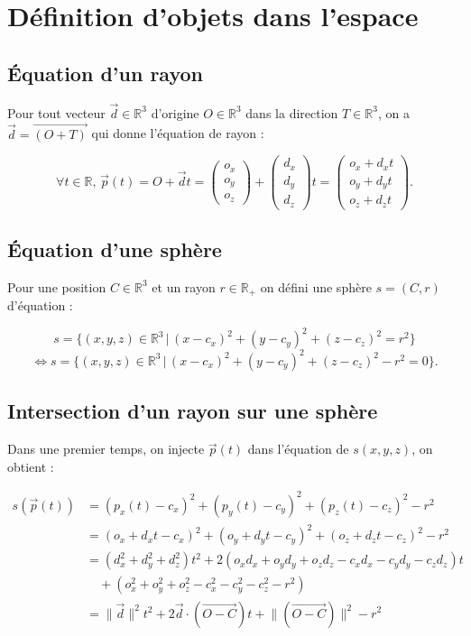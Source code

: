 \section{Définition d'objets dans l'espace}

\subsection{Équation d'un rayon}

Pour tout vecteur $\vec{d} \in \mathbb{R}^3$ d'origine $O \in \mathbb{R}^3$ dans la direction $T \in \mathbb{R}^3$, on a $\vec{d}=\overrightarrow{(O+T)}$ qui donne l'équation de rayon :

$$
\forall t  \in \mathbb{R}, \, 
{\vec{p}(t)} = {O + \vec{d}t} = \begin{pmatrix} o_x\\o_y\\o_z\end{pmatrix} + \begin{pmatrix} d_x\\d_y\\d_z\end{pmatrix}t =
\begin{pmatrix} o_x+d_xt\\o_y+d_yt\\o_z+d_zt\end{pmatrix}.
$$

\subsection{Équation d'une sphère}

Pour une position $C \in \mathbb{R}^3$ et un rayon $r \in \mathbb{R}_+$ on défini une sphère $s=(C, r)$ d'équation :

$$s = \{(x,y,z) \in \mathbb{R}^3 \, | \, (x - c_x)^2 + (y - c_y)^2 + (z - c_z)^2 = r^2 \}$$
$$\Leftrightarrow s = \{(x,y,z) \in \mathbb{R}^3 \, | \, (x - c_x)^2 + (y - c_y)^2 + (z - c_z)^2 - r^2 = 0 \}.$$

\subsection{Intersection d'un rayon sur une sphère}

Dans une premier temps, on injecte $\vec{p}(t)$ dans l'équation de $s(x,y,z)$, on obtient :

\begin{align*}
s(\vec{p}(t)) &= (p_x(t) - c_x)^2 + (p_y(t) - c_y)^2 + (p_z(t) - c_z)^2 - r^2 \\ 
              &= (o_x+d_x t - c_x)^2 + (o_y + d_y t - c_y)^2 + (o_z + d_z t- c_z)^2 - r^2 \\
              &= (d_x^2 + d_y^2 + d_z^2)t^2 + 2(o_x d_x + o_y d_y + o_z d_z - c_x d_x - c_y d_y - c_z d_z)t \\
              &\quad + (o_x^2 + o_y^2 + o_z^2 - c_x^2 - c_y^2 - c_z^2 - r^2) \\
              &= \lVert \vec{d} \rVert^2t^2 + 2\vec{d}\cdot(\overrightarrow{O-C})t + \lVert (\overrightarrow{O-C}) \rVert^2 - r^2
\end{align*}

